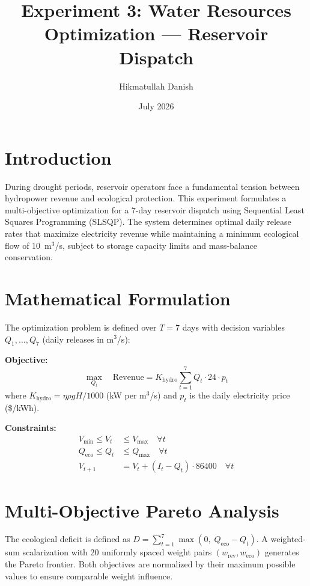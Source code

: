 \documentclass[12pt,a4paper]{article}
\title{Experiment 3: Water Resources Optimization — Reservoir Dispatch}
\author{Hikmatullah Danish \quad 3125999089}
\date{July 2026}
\begin{document}
\maketitle

\section{Introduction}
During drought periods, reservoir operators face a fundamental tension between hydropower revenue and ecological protection. This experiment formulates a multi-objective optimization for a 7-day reservoir dispatch using Sequential Least Squares Programming (SLSQP). The system determines optimal daily release rates that maximize electricity revenue while maintaining a minimum ecological flow of 10~m$^3$/s, subject to storage capacity limits and mass-balance conservation.

\section{Mathematical Formulation}
The optimization problem is defined over $T = 7$ days with decision variables $Q_1, \ldots, Q_7$ (daily releases in m$^3$/s):

\textbf{Objective:}
\begin{equation}
\max_{Q_t} \quad \text{Revenue} = K_{\text{hydro}} \sum_{t=1}^{7} Q_t \cdot 24 \cdot p_t
\end{equation}
where $K_{\text{hydro}} = \eta \rho g H / 1000$ (kW per m$^3$/s) and $p_t$ is the daily electricity price (\$/kWh).

\textbf{Constraints:}
\begin{align}
V_{\min} \leq V_t &\leq V_{\max} \quad \forall t \\
Q_{\text{eco}} \leq Q_t &\leq Q_{\max} \quad \forall t \\
V_{t+1} &= V_t + (I_t - Q_t) \cdot 86400 \quad \forall t
\end{align}

\section{Multi-Objective Pareto Analysis}
The ecological deficit is defined as $D = \sum_{t=1}^{7} \max(0,\; Q_{\text{eco}} - Q_t)$. A weighted-sum scalarization with 20 uniformly spaced weight pairs $(w_{\text{rev}}, w_{\text{eco}})$ generates the Pareto frontier. Both objectives are normalized by their maximum possible values to ensure comparable weight influence.
\end{document}

